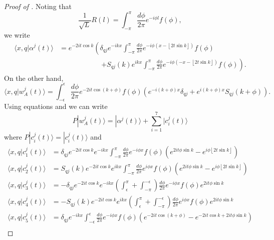 \documentclass[../thesis-main/thesis-main]{subfiles}
\begin{document}
\begin{proof}[Proof of {}]
Noting that
\begin{equation}
\frac{1}{\sqrt{L}}R(l)=\int_{-\pi}^{\pi}\frac{d\phi}{2\pi}e^{-i\phi l}f(\phi),
\end{equation}
we write
\begin{align}
\langle x,q|\alpha^{j}(t)\rangle & = e^{-2it\cos k}\left(\delta_{qj}e^{-ikx}\int_{-\pi}^{\pi}\frac{d\phi}{2\pi}e^{-i\phi\left(x-\left\lfloor 2t\sin k\right\rfloor \right)}f(\phi)\right.\nonumber\\
&\qquad\qquad\qquad  \left. +S_{qj}(k)e^{ikx}\int_{-\pi}^{\pi}\frac{d\phi}{2\pi}e^{-i\phi\left(-x-\left\lfloor 2t\sin k\right\rfloor \right)}f(\phi)\right).\label{eq:alpha_mat_elements}
\end{align}
On the other hand,
\begin{equation}
\langle x,q|w_{A}^{j}(t)\rangle=\int_{-\epsilon}^{\epsilon}\frac{d\phi}{2\pi}e^{-2it\cos\left(k+\phi\right)}f(\phi)\left(e^{-i\left(k+\phi\right)x}\delta_{qj}+e^{i\left(k+\phi\right)x}S_{qj}(k+\phi)\right).\label{eq:w_a_mat_elements}
\end{equation}
Using equations  and 
we can write\begin{equation}
P|w_{A}^{j}(t)\rangle=|\alpha^{j}(t)\rangle+\sum_{i=1}^{7}|c_{i}^{j}(t)\rangle\end{equation}
 where $P|c_{i}^{j}(t)\rangle=|c_{i}^{j}(t)\rangle$ and \begin{align*}
\langle x,q|c_{1}^{j}(t)\rangle & = \delta_{qj}e^{-2it\cos k}e^{-ikx}\int_{-\pi}^{\pi}\frac{d\phi}{2\pi}e^{-i\phi x}f(\phi)\left(e^{2it\phi\sin k}-e^{i\phi\left\lfloor 2t\sin k\right\rfloor }\right)\\
\langle x,q|c_{2}^{j}(t)\rangle & = S_{qj}(k)e^{-2it\cos k}e^{ikx}\int_{-\pi}^{\pi}\frac{d\phi}{2\pi}e^{i\phi x}f(\phi)\left(e^{2it\phi\sin k}-e^{i\phi\left\lfloor 2t\sin k\right\rfloor }\right)\\
\langle x,q|c_{3}^{j}(t)\rangle & = -\delta_{qj}e^{-2it\cos k}e^{-ikx}\left(\int_{\epsilon}^{\pi}+\int_{-\pi}^{-\epsilon}\right)\frac{d\phi}{2\pi}e^{-i\phi x}f(\phi)e^{2it\phi\sin k}\\
\langle x,q|c_{4}^{j}(t)\rangle & = -S_{qj}(k)e^{-2it\cos k}e^{ikx}\left(\int_{\epsilon}^{\pi}+\int_{-\pi}^{-\epsilon}\right)\frac{d\phi}{2\pi}e^{i\phi x}f(\phi)e^{2it\phi\sin k}\\
\langle x,q|c_{5}^{j}(t)\rangle & = \delta_{qj}e^{-ikx}\int_{-\epsilon}^{\epsilon}\frac{d\phi}{2\pi}e^{-i\phi x}f(\phi)\left(e^{-2it\cos\left(k+\phi\right)}-e^{-2it\cos k+2it\phi\sin k}\right)\\

\end{align*}
\end{proof}
\end{document}
